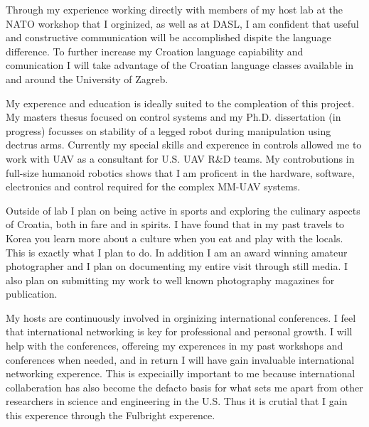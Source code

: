 \documentclass[12pt]{article}
\begin{document}
Through my experience working directly with members of my host lab at the NATO workshop that I orginized, as well as at DASL, I am confident that useful and constructive communication will be accomplished dispite the language difference.  
To further increase my Croation language capiability and comunication I will take advantage of the Croatian language classes available in and around the University of Zagreb. 

My experence and education is ideally suited to the compleation of this project.  
My masters thesus focused on control systems and my Ph.D. dissertation (in progress) focusses on stability of a legged robot during manipulation using dectrus arms.  
Currently my special skills and experence in controls allowed me to work with UAV as a consultant for U.S. UAV R\&D teams.
My controbutions in full-size humanoid robotics shows that I am proficent in the hardware, software, electronics and control required for the complex MM-UAV systems.


Outside of lab I plan on being active in sports and exploring the culinary aspects of Croatia, both in fare and in spirits.  
I have found that in my past travels to Korea you learn more about a culture when you eat and play with the locals.  
This is exactly what I plan to do.  
In addition I am an award winning amateur photographer and I plan on documenting my entire visit through still media.
I also plan on submitting my work to well known photography magazines for publication.

My hosts are continuously involved in orginizing international conferences.  
I feel that international networking is key for professional and personal growth.
I will help with the conferences, offereing my experences in my past workshops and conferences when needed, and in return I will have gain invaluable international networking experence.
This is expeciailly important to me because international collaberation has also become the defacto basis for what sets me apart from other researchers in science and engineering in the U.S. 
Thus it is crutial that I gain this experence through the Fulbright experence.
\end{document}
